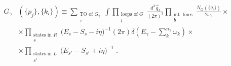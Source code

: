 \documentclass[%
 reprint,
 amsmath,amssymb,
 aps,
]{revtex4-1}
\begin{document}
\begin{align}
G_\gamma&(\{p_j\},\{k_i\})\equiv\sum_{\substack{\text{TO of $G_\gamma$} \\ \tau}}\int\prod_{\substack{\text{loops of $G$} \\ l}}\frac{d^3\vec{q}_l}{(2\pi)^3}\prod_{\substack{\text{int. lines} \\ b}}\frac{N_{G}(\{q_l\})}{2\omega_b}\times\nonumber\\
&\times \prod_{\substack{\text{states in $R$} \\ s}}\Big(E_s-S_s-i\eta\Big)^{-1}(2\pi)\delta(E_\gamma-\sum_k^{n_\gamma}\omega_k)\times\nonumber\\
&\times\prod_{\substack{\text{states in $L$} \\ s'}}\Big(E_{s'}-S_{s'}+i\eta\Big)^{-1}\;.\label{joretio}
\end{align}
\end{document}
